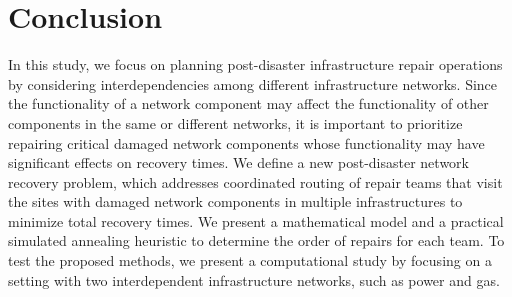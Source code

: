 \documentclass[11pt]{article}
\begin{document}





\section{Conclusion} \label{s:conclusion}

In this study, we focus on planning post-disaster infrastructure repair operations by considering interdependencies among different infrastructure networks. Since the functionality of a network component may affect the functionality of other components in the same or different networks, it is important to prioritize repairing critical damaged network components whose functionality may have significant effects on recovery times. We define a new post-disaster network recovery problem, which addresses coordinated routing of repair teams that visit the sites with damaged network components in multiple infrastructures to minimize total recovery times. We present a mathematical model and a practical simulated annealing heuristic to determine the order of repairs for each team. To test the proposed methods, we present a computational study by focusing on a setting with two interdependent infrastructure networks, such as power and gas. 
\end{document}
